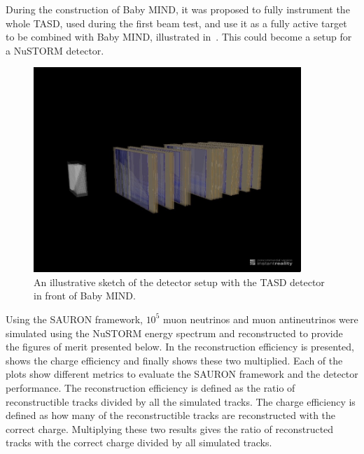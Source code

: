During the construction of Baby MIND, it was proposed to fully instrument the whole TASD, used during the first beam test, and use it as a fully active target to be combined with Baby MIND, illustrated in~. This could become a setup for a NuSTORM detector.

\begin{figure}[h!]
\centering
\includegraphics[width=0.9\textwidth]{figures/MINDAida.jpeg}
\caption{An illustrative sketch of the detector setup with the TASD detector in front of Baby MIND.}
\label{fig:TASDandMIND}
\end{figure}

Using the SAURON framework, $10^5$ muon neutrinos and muon antineutrinos were simulated using the NuSTORM energy spectrum and reconstructed to provide the figures of merit presented below. In  the reconstruction efficiency is presented,  shows the charge efficiency and finally  shows these two multiplied. Each of the plots show different metrics to evaluate the SAURON framework and the detector performance. The reconstruction efficiency is defined as the ratio of reconstructible tracks divided by all the simulated tracks. The charge efficiency is defined as how many of the reconstructible tracks are reconstructed with the correct charge. Multiplying these two results gives the ratio of reconstructed tracks with the correct charge divided by all simulated tracks.

